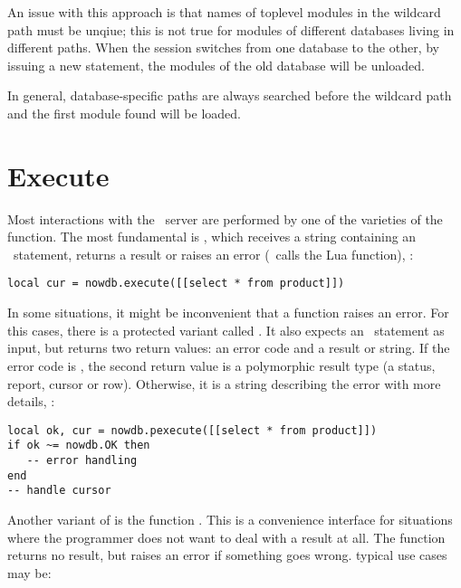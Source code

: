An issue with this approach is that names
of toplevel modules in the wildcard path must be unqiue;
this is not true for modules of different
databases living in different paths.
When the session switches from one database to the other,
by issuing a new  statement,
the modules of the old database will be unloaded.

In general, database-specific paths are always 
searched before the wildcard path
and the first module found will be
loaded.


\section{Execute}
Most interactions with the \nowdb\ server
are performed by one of the varieties of
the  function.
The most fundamental is ,
which receives a string containing an \sql\ statement,
returns a result or raises an error (\ie\ calls
the Lua  function), \eg:

\begin{lua}
\begin{lstlisting}
local cur = nowdb.execute([[select * from product]])
\end{lstlisting}
\end{lua}

In some situations, it might be inconvenient
that a function raises an error.
For this cases, there is a protected
variant called .
It also expects an \sql\ statement
as input, but returns two return values:
an error code and a result or string.
If the error code is ,
the second return value
is a polymorphic result type
(a status, report, cursor or row).
Otherwise, it is a string describing
the error with more details, \eg:

\begin{lua}
\begin{lstlisting}
local ok, cur = nowdb.pexecute([[select * from product]])
if ok ~= nowdb.OK then
   -- error handling
end
-- handle cursor
\end{lstlisting}
\end{lua}

Another variant of  is
the function .
This is a convenience interface for
situations where the programmer does
not want to deal with a result at all.
The function returns no result, but
raises an error if something goes wrong.
typical use cases may be:

